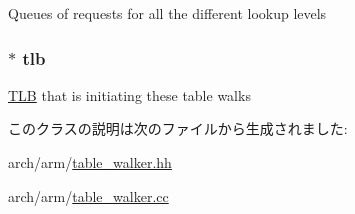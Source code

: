 \label{classArmISA_1_1TableWalker_af819b2b862d892da5df10248b6d72787}
Queues of requests for all the different lookup levels \hypertarget{classArmISA_1_1TableWalker_a9f0e11329a702fd34819769c899e4bd3}{
\subsubsection[{tlb}]{$\ast$ {\bf tlb}}}
\label{classArmISA_1_1TableWalker_a9f0e11329a702fd34819769c899e4bd3}
\hyperlink{classArmISA_1_1TLB}{TLB} that is initiating these table walks 

このクラスの説明は次のファイルから生成されました:\begin{DoxyCompactItemize}
\item 
arch/arm/\hyperlink{table__walker_8hh}{table\_\-walker.hh}\item 
arch/arm/\hyperlink{table__walker_8cc}{table\_\-walker.cc}\end{DoxyCompactItemize}
